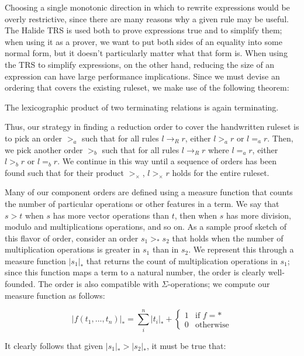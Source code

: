 \documentclass[acmsmall,review,anonymous]{acmart}\settopmatter{printfolios=true,printccs=false,printacmref=false}
\begin{document}
Choosing a single monotonic direction in which to rewrite expressions would be overly restrictive, since there are many reasons why a given rule may be useful. The Halide TRS is used both to prove expressions true and to simplify them; when using it as a prover, we want to put both sides of an equality into some normal form, but it doesn't particularly matter what that form is. When using the TRS to simplify expressions, on the other hand, reducing the size of an expression can have large performance implications. Since we must devise an ordering that covers the existing ruleset, we make use of the following theorem:

\begin{theorem}
The lexicographic product of two terminating relations is again terminating.
\end{theorem}

Thus, our strategy in finding a reduction order to cover the handwritten ruleset is to pick an order $>_a$ such that for all rules $l \rightarrow_R r$, either $l >_a r$ or $l =_a r$. Then, we pick another order $>_b$ such that for all rules $l \rightarrow_R r$ where $l =_a r$, either $l >_b r$ or $l =_b r$. We continue in this way until a sequence of orders has been found such that for their product $>_{\times}$, $l >_{\times} r$ holds for the entire ruleset.

Many of our component orders are defined using a measure function that counts the number of particular operations or other features in a term. We say that $s > t$ when $s$ has more vector operations than $t$, then when $s$ has more division, modulo and multiplications operations, and so on. As a sample proof sketch of this flavor of order, consider an order $s_1 >_* s_2$ that holds when the number of multiplication operations is greater in $s_1$ than in $s_2$. We represent this through a measure function $|s_1|_*$ that returns the count of multiplication operations in $s_1$; since this function maps a term to a natural number, the order is clearly well-founded. The order is also compatible with $\Sigma$-operations; we compute our measure function as follows:


\[
|f(t_1,...,t_n)|_* = \sum_i^n |t_i|_* + \begin{cases} 1 & \textrm{if } f = * \\
                                                      0 & \textrm{otherwise}
                                        \end{cases}
\]

It clearly follows that given $|s_1|_* > |s_2|_*$, it must be true that:
\end{document}
